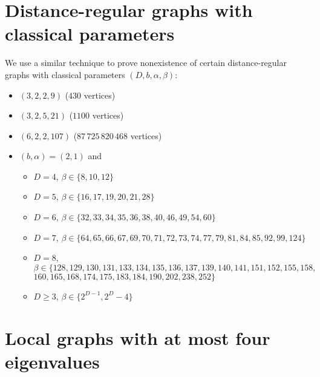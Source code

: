 \documentclass[11pt]{article}
\providecommand{\tightlist}{%
      \setlength{\itemsep}{0pt}\setlength{\parskip}{0pt}}
\renewcommand{\textbf}[1]{\textcolor[rgb]{1,0,0}{{#1}}}
\renewcommand{\emph}[1]{\textcolor[rgb]{0,0,1}{{#1}}}
\renewcommand{\sout}[1]{\textcolor[rgb]{0,0.5,0}{{#1}}}
\begin{document}
\newpage

    \hypertarget{distance-regular-graphs-with-classical-parameters}{%
\section*{Distance-regular graphs with classical
parameters}\label{distance-regular-graphs-with-classical-parameters}}

We use a similar technique to prove \sout{nonexistence} of certain
\emph{distance-regular graphs} with \emph{classical parameters}
\textbf{\((D, b, \alpha, \beta)\)}:
\begin{itemize}
\tightlist
\item \sout{\((3, 2, 2, 9)\)} (\sout{\(430\)} vertices)
\item \sout{\((3, 2, 5, 21)\)} (\sout{\(1100\)} vertices)
\item \sout{\((6, 2, 2, 107)\)} (\sout{\(87\,725\,820\,468\)}
vertices)
\item \sout{\((b, \alpha) = (2, 1)\)} and
  \begin{itemize}
  \tightlist
  \item \sout{\(D = 4\)}, \sout{\(\beta \in \{8, 10, 12\}\)}
  \item \sout{\(D = 5\)}, \sout{\(\beta \in \{16, 17, 19, 20, 21, 28\}\)}
  \item \sout{\(D = 6\)}, \sout{\(\beta \in \{32, 33, 34, 35, 36, 38, 40, 46, 49, 54, 60\}\)}
  \item \sout{\(D = 7\)}, \sout{\(\beta \in \{64, 65, 66, 67, 69, 70, 71, 72, 73, 74, 77, 79, 81, 84, 85, 92, 99, 124\}\)}
  \item \sout{\(D = 8\)}, \sout{\(\beta \in \{128, 129, 130, 131, 133, 134, 135, 136, 137, 139, 140, 141, 151, 152, 155, 158,\) \(160, 165, 168, 174, 175, 183, 184, 190, 202, 238, 252\}\)}
  \item \sout{\(D \ge 3\)}, \sout{\(\beta \in \{2^{D-1}, 2^D-4\}\)}
\end{itemize}
\end{itemize}

    \hypertarget{local-graphs-with-at-most-four-eigenvalues}{%
\section*{Local graphs with at most four
eigenvalues}\label{local-graphs-with-at-most-four-eigenvalues}}
\end{document}
